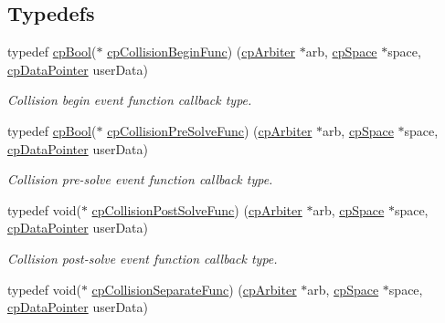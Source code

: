 \subsection*{Typedefs}
\begin{DoxyCompactItemize}
\item 
typedef \hyperlink{group__basic_types_gabc5e752c48f3449ca26ef413ecbd647e}{cp\+Bool}($\ast$ \hyperlink{group__cp_space_ga3134f145bfc7ca4ef69b350978c26a5a}{cp\+Collision\+Begin\+Func}) (\hyperlink{structcp_arbiter}{cp\+Arbiter} $\ast$arb, \hyperlink{structcp_space}{cp\+Space} $\ast$space, \hyperlink{group__basic_types_ga2ac2c3c31e21893941f9e4f8ee279447}{cp\+Data\+Pointer} user\+Data)
\begin{DoxyCompactList}\small\item\em Collision begin event function callback type. \end{DoxyCompactList}\item 
typedef \hyperlink{group__basic_types_gabc5e752c48f3449ca26ef413ecbd647e}{cp\+Bool}($\ast$ \hyperlink{group__cp_space_ga89b24d53d81a5a028198c3c2d3c39a9d}{cp\+Collision\+Pre\+Solve\+Func}) (\hyperlink{structcp_arbiter}{cp\+Arbiter} $\ast$arb, \hyperlink{structcp_space}{cp\+Space} $\ast$space, \hyperlink{group__basic_types_ga2ac2c3c31e21893941f9e4f8ee279447}{cp\+Data\+Pointer} user\+Data)
\begin{DoxyCompactList}\small\item\em Collision pre-\/solve event function callback type. \end{DoxyCompactList}\item 
\hypertarget{group__cp_space_gaccb60bbb090c97823f49ee49e4e5d3c3}{}typedef void($\ast$ \hyperlink{group__cp_space_gaccb60bbb090c97823f49ee49e4e5d3c3}{cp\+Collision\+Post\+Solve\+Func}) (\hyperlink{structcp_arbiter}{cp\+Arbiter} $\ast$arb, \hyperlink{structcp_space}{cp\+Space} $\ast$space, \hyperlink{group__basic_types_ga2ac2c3c31e21893941f9e4f8ee279447}{cp\+Data\+Pointer} user\+Data)\label{group__cp_space_gaccb60bbb090c97823f49ee49e4e5d3c3}

\begin{DoxyCompactList}\small\item\em Collision post-\/solve event function callback type. \end{DoxyCompactList}\item 
\hypertarget{group__cp_space_ga01427ab634c483879cfed5bb22610487}{}typedef void($\ast$ \hyperlink{group__cp_space_ga01427ab634c483879cfed5bb22610487}{cp\+Collision\+Separate\+Func}) (\hyperlink{structcp_arbiter}{cp\+Arbiter} $\ast$arb, \hyperlink{structcp_space}{cp\+Space} $\ast$space, \hyperlink{group__basic_types_ga2ac2c3c31e21893941f9e4f8ee279447}{cp\+Data\+Pointer} user\+Data)\label{group__cp_space_ga01427ab634c483879cfed5bb22610487}


\end{DoxyCompactItemize}

